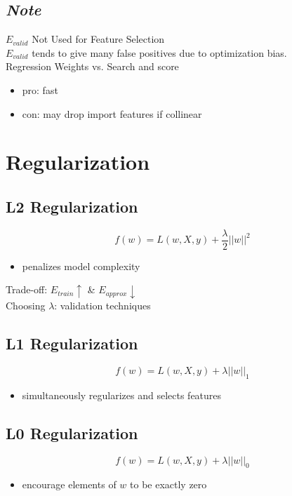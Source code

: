 \documentclass[10pt,landscape,a4paper]{article}
\begin{document}
\begin{multicols*}{5}
\subsection{\emph{Note}}
\(E_{valid}\) Not Used for Feature Selection \\
\(E_{valid}\) tends to give many false positives due to optimization bias. \\
Regression Weights vs. Search and score
\begin{itemize}
    \item pro: fast
    \item con: may drop import features if collinear
\end{itemize}

\section{Regularization}

\subsection{L2 Regularization}
\begin{dmath*}
    f(w) = L(w,X,y) + \frac{\lambda}{2} ||w||^2
\end{dmath*}
\begin{itemize}
    \item penalizes model complexity
\end{itemize}
Trade-off: \(E_{train} \uparrow \) \& \(E_{approx} \downarrow \) \\
Choosing \(\lambda \): validation techniques

\subsection{L1 Regularization}
\begin{dmath*}
    f(w) = L(w,X,y) + \lambda ||w||_1
\end{dmath*}
\begin{itemize}
    \item simultaneously regularizes and selects features
\end{itemize}

\subsection{L0 Regularization}
\begin{dmath*}
    f(w) = L(w,X,y) + \lambda ||w||_0
\end{dmath*}
\begin{itemize}
    \item encourage elements of \(w\) to be exactly zero
\end{itemize}


\end{multicols*}
\end{document}
